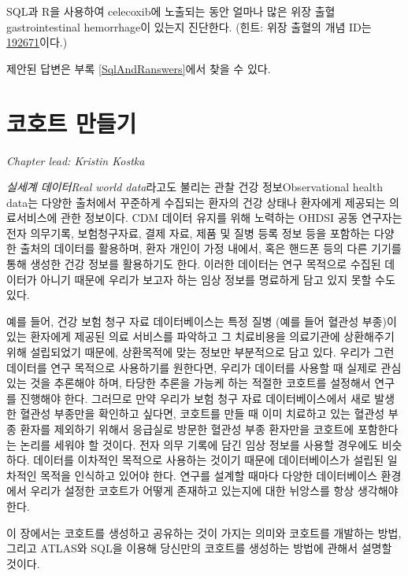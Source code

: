 \documentclass[10.5pt]{book}
\theoremstyle{definition}
\theoremstyle{definition}
\theoremstyle{definition}
\theoremstyle{remark}
\begin{document}
\protect\hypertarget{exr:exerciseGiBleedsDuringCelecoxib}{}{\label{exr:exerciseGiBleedsDuringCelecoxib}
}SQL과 R을 사용하여 celecoxib에 노출되는 동안 얼마나 많은 위장
출혈gastrointestinal hemorrhage이 있는지 진단한다. (힌트: 위장 출혈의
개념 ID는
\href{http://athena.ohdsi.org/search-terms/terms/192671}{192671}이다.)

제안된 답변은 부록 \ref{SqlAndRanswers}에서 찾을 수 있다.

\chapter{코호트 만들기}\label{Cohorts}

\emph{Chapter lead: Kristin Kostka}

\emph{실세계 데이터Real world data}라고도 불리는 관찰 건강
정보Observational health data는 다양한 출처에서 꾸준하게 수집되는 환자의
건강 상태나 환자에게 제공되는 의료서비스에 관한 정보이다. CDM 데이터
유지를 위해 노력하는 OHDSI 공동 연구자는 전자 의무기록, 보험청구자료,
결제 자료, 제품 및 질병 등록 정보 등을 포함하는 다양한 출처의 데이터를
활용하며, 환자 개인이 가정 내에서, 혹은 핸드폰 등의 다른 기기를 통해
생성한 건강 정보를 활용하기도 한다. 이러한 데이터는 연구 목적으로 수집된
데이터가 아니기 때문에 우리가 보고자 하는 임상 정보를 명료하게 담고 있지
못할 수도 있다.

예를 들어, 건강 보험 청구 자료 데이터베이스는 특정 질병 (예를 들어
혈관성 부종)이 있는 환자에게 제공된 의료 서비스를 파악하고 그 치료비용을
의료기관에 상환해주기 위해 설립되었기 때문에, 상환목적에 맞는 정보만
부분적으로 담고 있다. 우리가 그런 데이터를 연구 목적으로 사용하기를
원한다면, 우리가 데이터를 사용할 때 실제로 관심 있는 것을 추론해야 하며,
타당한 추론을 가능케 하는 적절한 코호트를 설정해서 연구를 진행해야 한다.
그러므로 만약 우리가 보험 청구 자료 데이터베이스에서 새로 발생한 혈관성
부종만을 확인하고 싶다면, 코호트를 만들 때 이미 치료하고 있는 혈관성
부종 환자를 제외하기 위해서 응급실로 방문한 혈관성 부종 환자만을
코호트에 포함한다는 논리를 세워야 할 것이다. 전자 의무 기록에 담긴 임상
정보를 사용할 경우에도 비슷하다. 데이터를 이차적인 목적으로 사용하는
것이기 때문에 데이터베이스가 설립된 일차적인 목적을 인식하고 있어야
한다. 연구를 설계할 때마다 다양한 데이터베이스 환경에서 우리가 설정한
코호트가 어떻게 존재하고 있는지에 대한 뉘앙스를 항상 생각해야 한다.

이 장에서는 코호트를 생성하고 공유하는 것이 가지는 의미와 코호트를
개발하는 방법, 그리고 ATLAS와 SQL을 이용해 당신만의 코호트를 생성하는
방법에 관해서 설명할 것이다.
\end{document}
